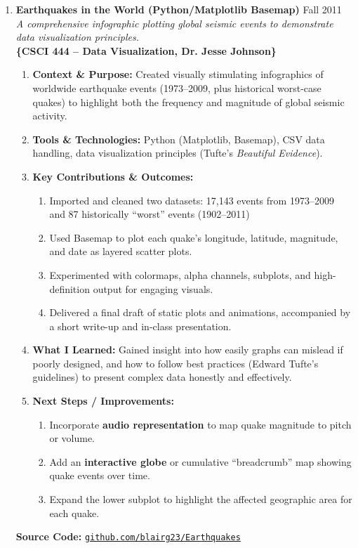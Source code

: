 \documentclass[oneside]{article}%
\begin{document}
\begin{enumerate}[]
\begin{enumerate}[]
			\normalsize
			\item \textbf{Earthquakes in the World (Python/Matplotlib Basemap)} \hfill Fall 2011\\
			\small
			\textit{A comprehensive infographic plotting global seismic events to demonstrate data visualization principles.}\\
			\textbf{\{CSCI 444 -- Data Visualization, Dr. Jesse Johnson\}}
				\begin{enumerate}[-]
					\item \textbf{Context \& Purpose:} Created visually stimulating infographics of worldwide earthquake events (1973--2009, plus historical worst-case quakes) to highlight both the frequency and magnitude of global seismic activity.
					\item \textbf{Tools \& Technologies:} Python (Matplotlib, Basemap), CSV data handling, data visualization principles (Tufte’s \textit{Beautiful Evidence}).
					\item \textbf{Key Contributions \& Outcomes:}
						\begin{enumerate}[--]
							\item Imported and cleaned two datasets: 17,143 events from 1973--2009 and 87 historically “worst” events (1902--2011)
							\item Used Basemap to plot each quake’s longitude, latitude, magnitude, and date as layered scatter plots.
							\item Experimented with colormaps, alpha channels, subplots, and high-definition output for engaging visuals.
							\item Delivered a final draft of static plots and animations, accompanied by a short write-up and in-class presentation.
						\end{enumerate}
					\item \textbf{What I Learned:} Gained insight into how easily graphs can mislead if poorly designed, and how to follow best practices (Edward Tufte’s guidelines) to present complex data honestly and effectively.
					\item \textbf{Next Steps / Improvements:}
						\begin{enumerate}[--]
							\item Incorporate \textbf{audio representation} to map quake magnitude to pitch or volume.
							\item Add an \textbf{interactive globe} or cumulative “breadcrumb” map showing quake events over time.
							\item Expand the lower subplot to highlight the affected geographic area for each quake.
						\end{enumerate}
				\end{enumerate}
				\vspace{3pt} %
				\textbf{Source Code:} \href{https://github.com/blairg23/Earthquakes}{\texttt{github.com/blairg23/Earthquakes}}\\


\end{enumerate}
\end{enumerate}
\end{document}
